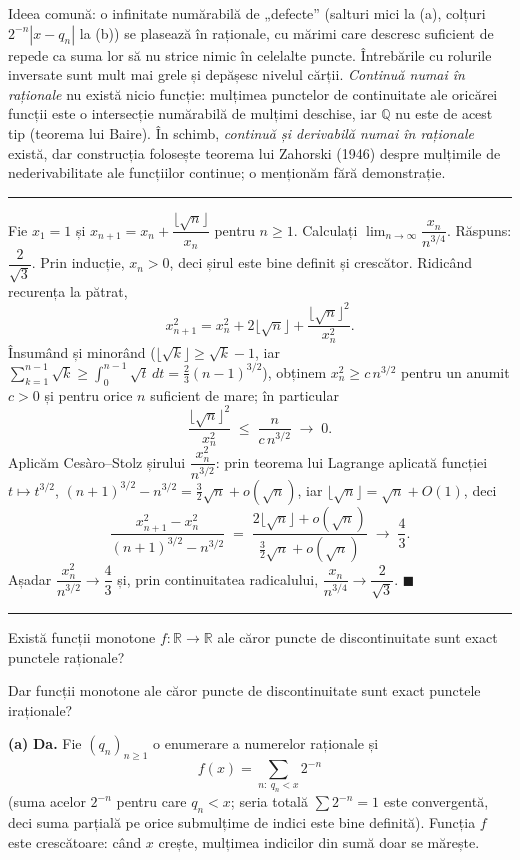 \begin{obs}
Ideea comună: o infinitate numărabilă de „defecte'' (salturi mici la (a), colțuri $2^{-n}|x-q_n|$ la (b)) se plasează în raționale, cu mărimi care descresc suficient de repede ca suma lor să nu strice nimic în celelalte puncte. Întrebările cu rolurile inversate sunt mult mai grele și depășesc nivelul cărții. \emph{Continuă numai în raționale} nu există nicio funcție: mulțimea punctelor de continuitate ale oricărei funcții este o intersecție numărabilă de mulțimi deschise, iar $\mathbb{Q}$ nu este de acest tip (teorema lui Baire). În schimb, \emph{continuă și derivabilă numai în raționale} există, dar construcția folosește teorema lui Zahorski (1946) despre mulțimile de nederivabilitate ale funcțiilor continue; o menționăm fără demonstrație.
\end{obs}
\vspace{1mm}\hrule

Fie $x_1 = 1$ și $x_{n+1} = x_n + \dfrac{\lfloor\sqrt{n}\rfloor}{x_n}$ pentru $n \geq 1$. Calculați $\displaystyle\lim_{n\to\infty} \dfrac{x_n}{n^{3/4}}$.
\sol Răspuns: $\dfrac{2}{\sqrt{3}}$. Prin inducție, $x_n > 0$, deci șirul este bine definit și crescător. Ridicând recurența la pătrat,
\[
x_{n+1}^2 = x_n^2 + 2\lfloor\sqrt{n}\rfloor + \frac{\lfloor\sqrt{n}\rfloor^2}{x_n^2}.
\]
Însumând și minorând ($\lfloor\sqrt{k}\rfloor \geq \sqrt{k} - 1$, iar $\sum_{k=1}^{n-1}\sqrt{k} \geq \int_0^{n-1}\sqrt{t}\,dt = \frac{2}{3}(n-1)^{3/2}$), obținem $x_n^2 \geq c\,n^{3/2}$ pentru un anumit $c > 0$ și pentru orice $n$ suficient de mare; în particular
\[
\frac{\lfloor\sqrt{n}\rfloor^2}{x_n^2} \;\leq\; \frac{n}{c\,n^{3/2}} \;\longrightarrow\; 0.
\]
Aplicăm Cesàro--Stolz șirului $\dfrac{x_n^2}{n^{3/2}}$: prin teorema lui Lagrange aplicată funcției $t \mapsto t^{3/2}$, $(n+1)^{3/2} - n^{3/2} = \frac{3}{2}\sqrt{n} + o(\sqrt{n})$, iar $\lfloor\sqrt{n}\rfloor = \sqrt{n} + O(1)$, deci
\[
\frac{x_{n+1}^2 - x_n^2}{(n+1)^{3/2} - n^{3/2}} \;=\; \frac{2\lfloor\sqrt{n}\rfloor + o(\sqrt{n})}{\frac{3}{2}\sqrt{n} + o(\sqrt{n})} \;\longrightarrow\; \frac{4}{3}.
\]
Așadar $\dfrac{x_n^2}{n^{3/2}} \to \dfrac{4}{3}$ și, prin continuitatea radicalului, $\dfrac{x_n}{n^{3/4}} \to \dfrac{2}{\sqrt{3}}$. $\blacksquare$
\vspace{1mm}\hrule

\begin{parti}
  \item Există funcții monotone $f:\mathbb{R}\to\mathbb{R}$ ale căror puncte de discontinuitate sunt exact punctele raționale?
  \item Dar funcții monotone ale căror puncte de discontinuitate sunt exact punctele iraționale?
\end{parti}
\sol\noindent\textbf{(a)} \textbf{Da.} Fie $(q_n)_{n\ge1}$ o enumerare a numerelor raționale și
\[ f(x)=\sum_{n:\ q_n<x}2^{-n} \]
(suma acelor $2^{-n}$ pentru care $q_n<x$; seria totală $\sum 2^{-n}=1$ este convergentă, deci suma parțială pe orice submulțime de indici este bine definită). Funcția $f$ este crescătoare: când $x$ crește, mulțimea indicilor din sumă doar se mărește.

